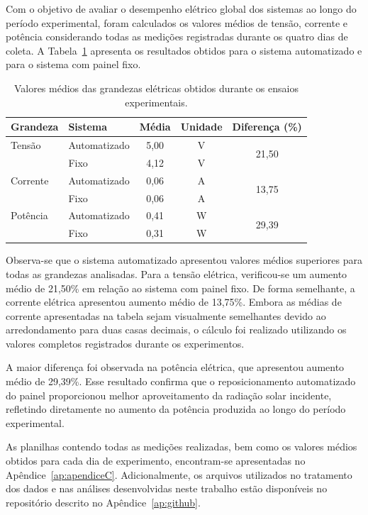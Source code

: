 Com o objetivo de avaliar o desempenho elétrico global dos sistemas ao longo do período experimental, foram calculados os valores médios de tensão, corrente e potência considerando todas as medições registradas durante os quatro dias de coleta. A Tabela~\ref{tab:medias_eletricas} apresenta os resultados obtidos para o sistema automatizado e para o sistema com painel fixo.

\begin{table}[H]
\centering
\caption{Valores médios das grandezas elétricas obtidos durante os ensaios experimentais.}
\label{tab:medias_eletricas}
\begin{tabular}{llccc}
\hline
\textbf{Grandeza} & \textbf{Sistema} & \textbf{Média} & \textbf{Unidade} & \textbf{Diferença (\%)}\\
\hline
Tensão  & Automatizado & 5,00 & V & \multirow{2}{*}{21,50}\\
         & Fixo         & 4,12 & V & \\
\hline
Corrente& Automatizado & 0,06 & A & \multirow{2}{*}{13,75}\\
         & Fixo         & 0,06 & A & \\
\hline
Potência& Automatizado & 0,41 & W & \multirow{2}{*}{29,39}\\
         & Fixo         & 0,31 & W & \\
\hline
\end{tabular}
\end{table}

Observa-se que o sistema automatizado apresentou valores médios superiores para todas as grandezas analisadas. Para a tensão elétrica, verificou-se um aumento médio de 21,50\% em relação ao sistema com painel fixo. De forma semelhante, a corrente elétrica apresentou aumento médio de 13,75\%. Embora as médias de corrente apresentadas na tabela sejam visualmente semelhantes devido ao arredondamento para duas casas decimais, o cálculo foi realizado utilizando os valores completos registrados durante os experimentos.

A maior diferença foi observada na potência elétrica, que apresentou aumento médio de 29,39\%. Esse resultado confirma que o reposicionamento automatizado do painel proporcionou melhor aproveitamento da radiação solar incidente, refletindo diretamente no aumento da potência produzida ao longo do período experimental.

As planilhas contendo todas as medições realizadas, bem como os valores médios obtidos para cada dia de experimento, encontram-se apresentadas no Apêndice~\ref{ap:apendiceC}. Adicionalmente, os arquivos utilizados no tratamento dos dados e nas análises desenvolvidas neste trabalho estão disponíveis no repositório descrito no Apêndice~\ref{ap:github}.

